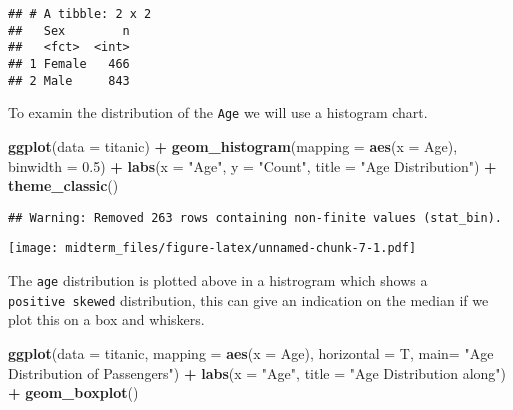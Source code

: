 \documentclass[]{article}
\newenvironment{Shaded}{\begin{snugshade}}{\end{snugshade}}
\newcommand{\DataTypeTok}[1]{\textcolor[rgb]{0.13,0.29,0.53}{#1}}
\newcommand{\FloatTok}[1]{\textcolor[rgb]{0.00,0.00,0.81}{#1}}
\newcommand{\KeywordTok}[1]{\textcolor[rgb]{0.13,0.29,0.53}{\textbf{#1}}}
\newcommand{\NormalTok}[1]{#1}
\newcommand{\OperatorTok}[1]{\textcolor[rgb]{0.81,0.36,0.00}{\textbf{#1}}}
\newcommand{\StringTok}[1]{\textcolor[rgb]{0.31,0.60,0.02}{#1}}
\begin{document}
\begin{Shaded}
\end{Shaded}

\begin{verbatim}
## # A tibble: 2 x 2
##   Sex        n
##   <fct>  <int>
## 1 Female   466
## 2 Male     843
\end{verbatim}

To examin the distribution of the \texttt{Age} we will use a histogram
chart.

\begin{Shaded}
\begin{Highlighting}[]
\KeywordTok{ggplot}\NormalTok{(}\DataTypeTok{data =}\NormalTok{ titanic) }\OperatorTok{+}
\StringTok{      }\KeywordTok{geom_histogram}\NormalTok{(}\DataTypeTok{mapping =} \KeywordTok{aes}\NormalTok{(}\DataTypeTok{x =}\NormalTok{ Age), }\DataTypeTok{binwidth =} \FloatTok{0.5}\NormalTok{) }\OperatorTok{+}\StringTok{ }
\StringTok{      }\KeywordTok{labs}\NormalTok{(}\DataTypeTok{x =} \StringTok{"Age"}\NormalTok{, }\DataTypeTok{y =} \StringTok{"Count"}\NormalTok{, }\DataTypeTok{title =} \StringTok{"Age Distribution"}\NormalTok{) }\OperatorTok{+}
\StringTok{        }\KeywordTok{theme_classic}\NormalTok{()}
\end{Highlighting}
\end{Shaded}

\begin{verbatim}
## Warning: Removed 263 rows containing non-finite values (stat_bin).
\end{verbatim}

\texttt{[image: midterm\_files/figure-latex/unnamed-chunk-7-1.pdf]}

The \texttt{age} distribution is plotted above in a histrogram which
shows a \texttt{positive\ skewed} distribution, this can give an
indication on the median if we plot this on a box and whiskers.

\begin{Shaded}
\begin{Highlighting}[]
 \KeywordTok{ggplot}\NormalTok{(}\DataTypeTok{data =}\NormalTok{ titanic, }\DataTypeTok{mapping =} \KeywordTok{aes}\NormalTok{(}\DataTypeTok{x =}\NormalTok{ Age), }\DataTypeTok{horizontal =}\NormalTok{ T, }\DataTypeTok{main=} \StringTok{"Age Distribution of Passengers"}\NormalTok{) }\OperatorTok{+}
\StringTok{   }\KeywordTok{labs}\NormalTok{(}\DataTypeTok{x =} \StringTok{"Age"}\NormalTok{, }\DataTypeTok{title =} \StringTok{"Age Distribution along"}\NormalTok{) }\OperatorTok{+}
\StringTok{      }\KeywordTok{geom_boxplot}\NormalTok{()}
\end{Highlighting}
\end{Shaded}
\end{document}
